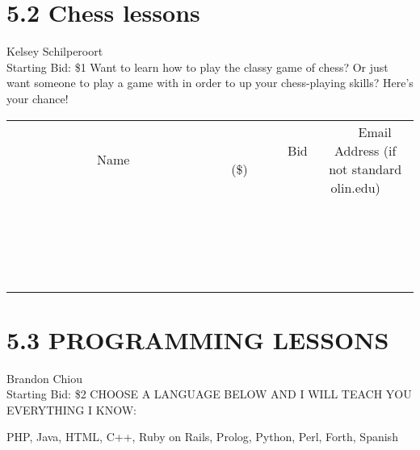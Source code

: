 \documentclass[11pt]{article}
\begin{document}
\section*{5.2 Chess lessons}
Kelsey Schilperoort
\\
Starting Bid: \$1
\newline
Want to learn how to play the classy game of chess? Or just want someone to play a game with in order to up your chess-playing skills? Here's your chance!
\\[3ex]
\begin{tabular}{c c c}
~~~~~~~~~~~~~Name~~~~~~~~~~~~~ & ~~~~~~~~~Bid (\$)~~~~~~~~~  & ~~~Email Address (if not standard olin.edu)~~~\\
 & & \\
\hline
 & & \\
\hline
 & & \\
\hline
 & & \\
\hline
 & & \\
\hline
 & & \\
\hline
 & & \\
\hline
 & & \\
\hline
 & & \\
\hline
 & & \\
\hline
 & & \\
\hline
 & & \\
\hline
 & & \\
\hline
 & & \\
\hline
 & & \\
\hline
 & & \\
\hline
 & & \\
\hline
 & & \\
\hline
 & & \\
\hline
\end{tabular}
\newpage
\section*{5.3 PROGRAMMING LESSONS}
Brandon Chiou
\\
Starting Bid: \$2
\newline
CHOOSE A LANGUAGE BELOW AND I WILL TEACH YOU EVERYTHING I KNOW:

PHP, Java, HTML, C++, Ruby on Rails, Prolog, Python, Perl, Forth, Spanish
\end{document}
